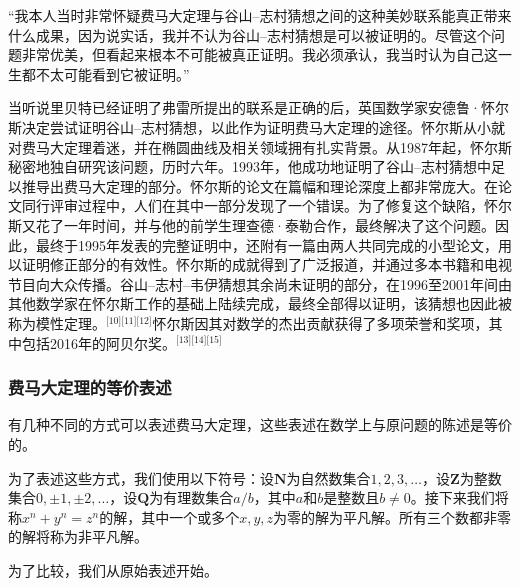 “我本人当时非常怀疑费马大定理与谷山–志村猜想之间的这种美妙联系能真正带来什么成果，因为说实话，我并不认为谷山–志村猜想是可以被证明的。尽管这个问题非常优美，但看起来根本不可能被真正证明。我必须承认，我当时认为自己这一生都不太可能看到它被证明。”

当听说里贝特已经证明了弗雷所提出的联系是正确的后，英国数学家安德鲁·怀尔斯决定尝试证明谷山–志村猜想，以此作为证明费马大定理的途径。怀尔斯从小就对费马大定理着迷，并在椭圆曲线及相关领域拥有扎实背景。从1987年起，怀尔斯秘密地独自研究该问题，历时六年。1993年，他成功地证明了谷山–志村猜想中足以推导出费马大定理的部分。怀尔斯的论文在篇幅和理论深度上都非常庞大。在论文同行评审过程中，人们在其中一部分发现了一个错误。为了修复这个缺陷，怀尔斯又花了一年时间，并与他的前学生理查德·泰勒合作，最终解决了这个问题。因此，最终于1995年发表的完整证明中，还附有一篇由两人共同完成的小型论文，用以证明修正部分的有效性。怀尔斯的成就得到了广泛报道，并通过多本书籍和电视节目向大众传播。谷山–志村–韦伊猜想其余尚未证明的部分，在1996至2001年间由其他数学家在怀尔斯工作的基础上陆续完成，最终全部得以证明，该猜想也因此被称为模性定理。\(^\text{[10][11][12]}\)怀尔斯因其对数学的杰出贡献获得了多项荣誉和奖项，其中包括2016年的阿贝尔奖。\(^\text{[13][14][15]}\)
\subsubsection{费马大定理的等价表述}
有几种不同的方式可以表述费马大定理，这些表述在数学上与原问题的陈述是等价的。

为了表述这些方式，我们使用以下符号：设\( \mathbf{N} \)为自然数集合\( 1, 2, 3, \dots \)，设\( \mathbf{Z} \)为整数集合\( 0, \pm 1, \pm 2, \dots \)，设\( \mathbf{Q} \)为有理数集合\(a/b\)，其中\( a \)和\( b \)是整数且\( b \neq 0 \)。接下来我们将称\( x^n + y^n = z^n \)的解，其中一个或多个\( x, y, z \)为零的解为平凡解。所有三个数都非零的解将称为非平凡解。

为了比较，我们从原始表述开始。

